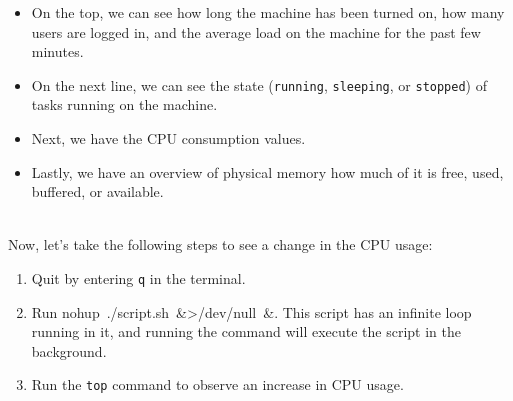 \begin{itemize}
\item
\protect{}\label{B0Yu1P_-idH9g-J39_Bd-}
On the top, we can see how long the machine has been turned on, how many users are logged in, and the average load on the machine for the past few minutes.
\item
\protect{}\label{MCTVdbz6QXni_Yzq_k9qt}
On the next line, we can see the state (\texttt{running}, \texttt{sleeping}, or \texttt{stopped}) of tasks running on the machine.
\item
\protect{}\label{pE4cDhw1iYUQUApxXywes}
Next, we have the CPU consumption values.
\item
\protect{}\label{P55tl4d9pz6xhGQBDb2Xv}
Lastly, we have an overview of physical memory how much of it is free, used, buffered, or available.
\end{itemize}
\\
Now, let's take the following steps to see a change in the CPU usage:

\begin{enumerate}
\item
\protect{}\label{cUT2-mh2nCGv257c_2SXh}
Quit by entering \texttt{q} in the terminal.
\item
\protect{}\label{R248vsquVhtgNUtraoHfW}
Run nohup\ ./script.sh\ \&\textgreater{/dev/null\ \&}. This script has an infinite loop running in it, and running the command will execute the script in the background.
\item
\protect{}\label{dL7Hm4CrOf5Oa7g1FuXgk}
Run the \texttt{top} command to observe an increase in CPU usage.
\end{enumerate}

